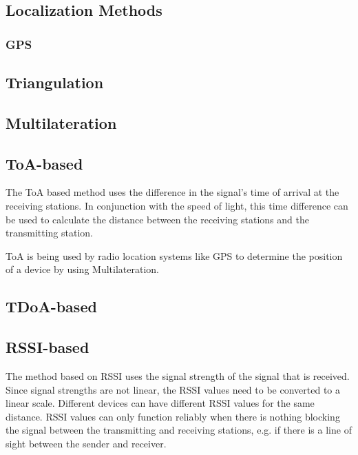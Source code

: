 \subsection{Localization Methods}



\subsubsection{\ac{GPS}}


\subsection{Triangulation}

\subsection{Multilateration}

\subsection{\acs{ToA}-based}

The \acf{ToA} based method uses the difference in the signal's time of arrival at the receiving stations.
In conjunction with the speed of light, this time difference can be used to calculate the distance between the receiving stations and the transmitting station.

\ac{ToA} is being used by radio location systems like \ac{GPS} to determine the position of a device by using Multilateration.

\subsection{\acs{TDoA}-based}



\subsection{\acs{RSSI}-based}

The method based on \acf{RSSI} uses the signal strength of the signal that is received.
Since signal strengths are not linear, the \ac{RSSI} values need to be converted to a linear scale.
Different devices can have different \ac{RSSI} values for the same distance.
\ac{RSSI} values can only function reliably when there is nothing blocking the signal between the transmitting and receiving stations, e.g. if there is a line of sight between the sender and receiver.

